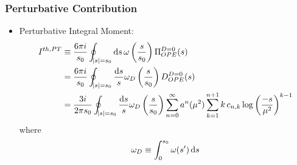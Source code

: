 \documentclass{beamer}
\begin{document}
\begin{frame}
  \frametitle{Perturbative Contribution}
  \begin{itemize}
  \item Perturbative Integral Moment:
    \begin{equation}
      \begin{split}
        I^{th,PT} &\equiv \frac{6 \pi i}{s_0} \oint_{\abs{s}=s_0} \dif s\, \omega\left(\frac{s}{s_0}\right) \Pi_{OPE}^{D=0}(s) \\
        &= \frac{6 \pi i}{s_0} \oint_{\abs{s}=s_0} \frac{\dif s}{s} \omega_D\left(\frac{s}{s_0}\right) D_{OPE}^{D=0}(s) \\
        &= \frac{3 i}{2 \pi s_0} \oint_{\abs{s}=s_0} \frac{\dif s}{s}
        \omega_D\left(\frac{s}{s_0}\right) \sum_{n=0}^\infty a^n(\mu^2)
        \sum_{k=1}^{n+1} k\, c_{n,k} \log\left( \frac{-s}{\mu^2} \right)^{k-1}
      \end{split}
    \end{equation}
    where
    \begin{equation}
      \omega_D \equiv \int_0^{s_0} \omega(s^\prime) \dif s
    \end{equation}
  \end{itemize}
\end{frame}
\end{document}
